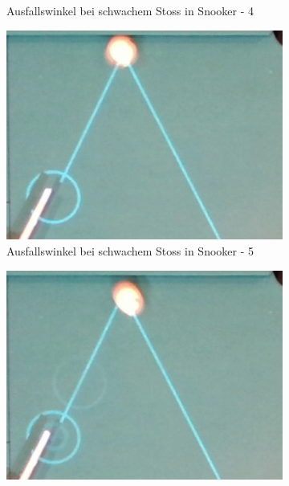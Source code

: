 \begin{figure}[h!]
\begin{subfigure}[b]{0.2\textwidth}
        \caption{Ausfallswinkel bei schwachem Stoss in Snooker - 4}
        \label{fig:rebound_angle_slow_snooker_4}
    \end{subfigure}
    \hfill
    \begin{subfigure}[b]{0.2\textwidth}
        \centering
        \includegraphics[width=1.0\linewidth]{../common/04_results/resources/simulation/rebound_angle_slow_snooker/00_rail_rebound_angle_slow_snooker_05.png}
        \caption{Ausfallswinkel bei schwachem Stoss in Snooker - 5}
        \label{fig:rebound_angle_slow_snooker_5}
    \end{subfigure}
    \hfill
    \begin{subfigure}[b]{0.2\textwidth}
        \centering
        \includegraphics[width=1.0\linewidth]{../common/04_results/resources/simulation/rebound_angle_slow_snooker/00_rail_rebound_angle_slow_snooker_06.png}

\end{subfigure}
\end{figure}
